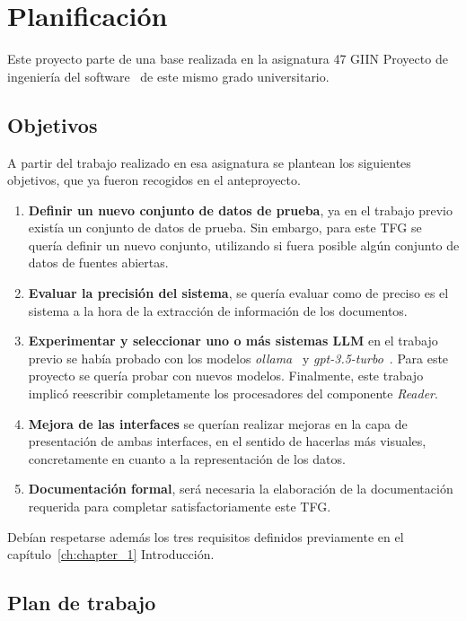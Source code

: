 \section{Planificación}\label{sec:desarrollo_de_software}

Este proyecto parte de una base realizada en la asignatura 47 GIIN Proyecto de ingeniería del
software~\cite{url_viu_47_proyecto} de este mismo grado universitario.

\subsection*{Objetivos}

A partir del trabajo realizado en esa asignatura se plantean los siguientes objetivos, que ya fueron recogidos en el
anteproyecto.

\begin{enumerate}
    \item \textbf{Definir un nuevo conjunto de datos de prueba},
    ya en el trabajo previo existía un conjunto de datos de prueba.
    Sin embargo, para este TFG se quería definir un nuevo conjunto, utilizando si fuera posible algún conjunto de
    datos de fuentes abiertas.
    \item \textbf{Evaluar la precisión del sistema},
    se quería evaluar como de preciso es el sistema a la hora de la extracción de información de los documentos.
    \item \textbf{Experimentar y seleccionar uno o más sistemas LLM}
    en el trabajo previo se había probado con los modelos \textit{ollama}~\cite{url_ollama} y
    \textit{gpt-3.5-turbo}~\cite{url_gpt3_5}.
    Para este proyecto se quería probar con nuevos modelos.
    Finalmente, este trabajo implicó reescribir completamente los procesadores del componente \textit{Reader}.
    \item \textbf{Mejora de las interfaces}
    se querían realizar mejoras en la capa de presentación de ambas interfaces, en el sentido de hacerlas más
    visuales, concretamente en cuanto a la representación de los datos.
    \item \textbf{Documentación formal},
    será necesaria la elaboración de la documentación requerida para completar satisfactoriamente este TFG.
\end{enumerate}

Debían respetarse además los tres requisitos definidos previamente en el capítulo~\ref{ch:chapter_1} Introducción.

\subsection*{Plan de trabajo}

